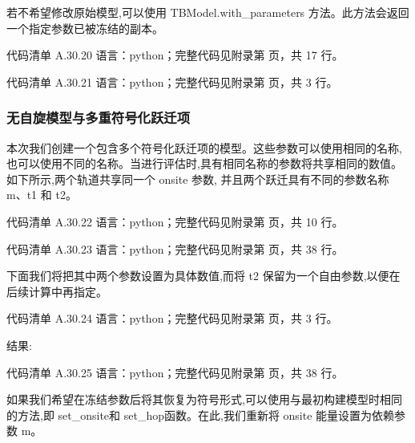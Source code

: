 \documentclass[lang=cn,scheme=chinese,color=blue,device=normal,toc=onecol,math=cm]{elegantbook}
\begin{document}
若不希望修改原始模型,可以使用 TBModel.with\_\allowbreak{}parameters 方法。此方法会返回一个指定参数已被冻结的副本。\par


\begin{codeindexbox}{代码清单 A.30.20}
语言：python；完整代码见附录第 \pageref{code:30:20} 页，共 17 行。
\end{codeindexbox}


\begin{codeindexbox}{代码清单 A.30.21}
语言：python；完整代码见附录第 \pageref{code:30:21} 页，共 3 行。
\end{codeindexbox}


\subsubsection{无自旋模型与多重符号化跃迁项}


本次我们创建一个包含多个符号化跃迁项的模型。这些参数可以使用相同的名称,也可以使用不同的名称。当进行评估时,具有相同名称的参数将共享相同的数值。如下所示,两个轨道共享同一个 onsite 参数, 并且两个跃迁具有不同的参数名称 m、t1 和 t2。\par


\begin{codeindexbox}{代码清单 A.30.22}
语言：python；完整代码见附录第 \pageref{code:30:22} 页，共 10 行。
\end{codeindexbox}


\begin{codeindexbox}{代码清单 A.30.23}
语言：python；完整代码见附录第 \pageref{code:30:23} 页，共 38 行。
\end{codeindexbox}


下面我们将把其中两个参数设置为具体数值,而将 t2 保留为一个自由参数,以便在后续计算中再指定。\par


\begin{codeindexbox}{代码清单 A.30.24}
语言：python；完整代码见附录第 \pageref{code:30:24} 页，共 3 行。
\end{codeindexbox}


结果:\par


\begin{codeindexbox}{代码清单 A.30.25}
语言：python；完整代码见附录第 \pageref{code:30:25} 页，共 38 行。
\end{codeindexbox}


如果我们希望在冻结参数后将其恢复为符号形式,可以使用与最初构建模型时相同的方法,即 set\_\allowbreak{}onsite和 set\_\allowbreak{}hop函数。在此,我们重新将 onsite 能量设置为依赖参数 m。\par
\end{document}
